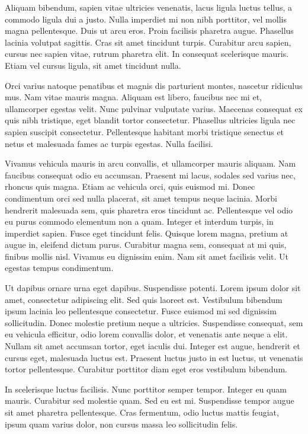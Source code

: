 \documentclass{homework}
\begin{document}
Aliquam bibendum, sapien vitae ultricies venenatis, lacus ligula luctus tellus, a commodo ligula dui a justo. Nulla imperdiet mi non nibh porttitor, vel mollis magna pellentesque. Duis ut arcu eros. Proin facilisis pharetra augue. Phasellus lacinia volutpat sagittis. Cras sit amet tincidunt turpis. Curabitur arcu sapien, cursus nec sapien vitae, rutrum pharetra elit. In consequat scelerisque mauris. Etiam vel cursus ligula, sit amet tincidunt nulla.

Orci varius natoque penatibus et magnis dis parturient montes, nascetur ridiculus mus. Nam vitae mauris magna. Aliquam est libero, faucibus nec mi et, ullamcorper egestas velit. Nunc pulvinar vulputate varius. Maecenas consequat ex quis nibh tristique, eget blandit tortor consectetur. Phasellus ultricies ligula nec sapien suscipit consectetur. Pellentesque habitant morbi tristique senectus et netus et malesuada fames ac turpis egestas. Nulla facilisi.

Vivamus vehicula mauris in arcu convallis, et ullamcorper mauris aliquam. Nam faucibus consequat odio eu accumsan. Praesent mi lacus, sodales sed varius nec, rhoncus quis magna. Etiam ac vehicula orci, quis euismod mi. Donec condimentum orci sed nulla placerat, sit amet tempus neque lacinia. Morbi hendrerit malesuada sem, quis pharetra eros tincidunt ac. Pellentesque vel odio eu purus commodo elementum non a quam. Integer et interdum turpis, in imperdiet sapien. Fusce eget tincidunt felis. Quisque lorem magna, pretium at augue in, eleifend dictum purus. Curabitur magna sem, consequat at mi quis, finibus mollis nisl. Vivamus eu dignissim enim. Nam sit amet facilisis velit. Ut egestas tempus condimentum.

Ut dapibus ornare urna eget dapibus. Suspendisse potenti. Lorem ipsum dolor sit amet, consectetur adipiscing elit. Sed quis laoreet est. Vestibulum bibendum ipsum lacinia leo pellentesque consectetur. Fusce euismod mi sed dignissim sollicitudin. Donec molestie pretium neque a ultricies. Suspendisse consequat, sem eu vehicula efficitur, odio lorem convallis dolor, et venenatis ante neque a elit. Nullam sit amet accumsan tortor, eget iaculis dui. Integer est augue, hendrerit et cursus eget, malesuada luctus est. Praesent luctus justo in est luctus, ut venenatis tortor pellentesque. Curabitur porttitor diam eget eros vestibulum bibendum.

In scelerisque luctus facilisis. Nunc porttitor semper tempor. Integer eu quam mauris. Curabitur sed molestie quam. Sed eu est mi. Suspendisse tempor augue sit amet pharetra pellentesque. Cras fermentum, odio luctus mattis feugiat, ipsum quam varius dolor, non cursus massa leo sollicitudin felis.
\end{document}
